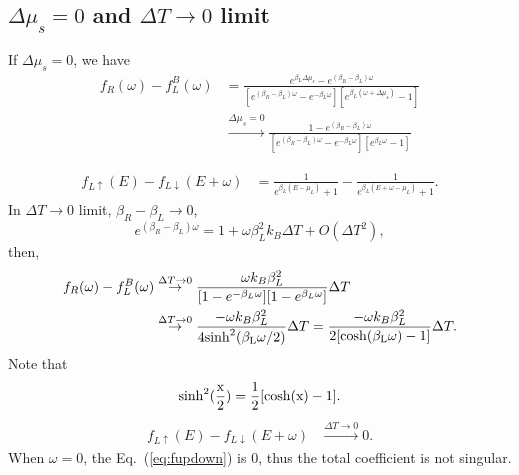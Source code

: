 \documentclass[aps,prb,onecolumn,amssymb,amsmath,superscriptaddress]{revtex4-1}
\begin{document}
\subsection{$\Delta\mu_s=0$ and $\Delta T\to 0$ limit}
If $\Delta\mu_{s} = 0$, we have
\begin{equation}
\begin{split}
f_{R}(\omega)-f_{L}^{B}(\omega) & =\frac{e^{\beta_{L}\Delta\mu_{s}} - e^{(\beta_{R}-\beta_{L})\omega}}{[e^{(\beta_{R}-\beta_{L})\omega}-e^{-\beta_{L}\omega}][e^{\beta_{L}(\omega+\Delta\mu_{s})}-1]} \\
&\stackrel{\Delta \mu_s= 0}{\rightarrow} \frac{1-e^{(\beta_{R}-\beta_{L})\omega}}{[e^{(\beta_{R}-\beta_{L})\omega}-e^{-\beta_{L}\omega}][e^{\beta_{L}\omega}-1]}
\end{split}
\end{equation}

\begin{equation}\label{eq:fupdown}
\begin{split}
f_{L\uparrow}(E)-f_{L\downarrow}(E+\omega) &= \frac{1}{e^{\beta_{L}(E-\mu_{L})}+1} - \frac{1}{e^{\beta_{L}(E+\omega-\mu_{L})}+1}.
\end{split}
\end{equation}
In $\Delta T\to 0$ limit, $\beta_{R}-\beta_{L} \to 0$,
\begin{equation}
e^{(\beta_{R}-\beta_{L})\omega} = 1 + \omega\beta_{L}^{2} k_{B}\Delta T + O(\Delta T^{2}),
\end{equation}
then,
\begin{equation}
\begin{split}
f_{R}(\omega)-f_{L}^{B}(\omega) &\stackrel{\Delta T\to 0}{\rightarrow}  \frac{\omega k_{B}\beta_{L}^{2} } {[ 1 - e^{-\beta_{L}\omega}] [1-e^{\beta_{L} \omega}]}\Delta T \\
& \stackrel{\Delta T\to 0}{\rightarrow} \frac{-\omega k_{B}\beta_{L}^{2}} {4\rm{sinh}^2(\beta_{L}\omega/2)}\Delta T  = \frac{-\omega k_{B}\beta_{L}^{2}} {2[\rm{cosh}(\beta_{L}\omega)-1]}\Delta T.
\end{split}
\end{equation}
Note that
\[
\rm{sinh}^2(\frac{x}{2}) = \frac{1}{2}[\rm{cosh}(x)-1].
\]
\begin{equation}\label{eq:fupdown}
\begin{split}
f_{L\uparrow}(E)-f_{L\downarrow}(E+\omega) & \stackrel{\Delta T\to 0}{\rightarrow} 0.
\end{split}
\end{equation}
When $\omega=0$, the Eq.~(\ref{eq:fupdown}) is 0, thus the total coefficient is not singular. 
\end{document}
